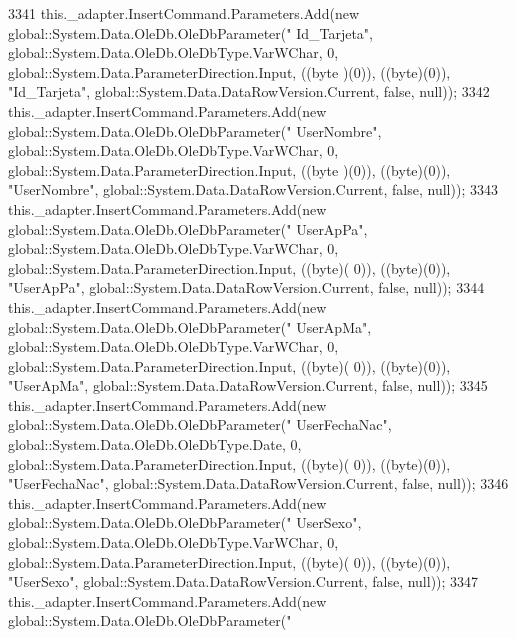 \begin{DoxyCode}
3341             this.\_adapter.InsertCommand.Parameters.Add(\textcolor{keyword}{new} global::System.Data.OleDb.OleDbParameter(\textcolor{stringliteral}{"
      Id\_Tarjeta"}, global::System.Data.OleDb.OleDbType.VarWChar, 0, global::System.Data.ParameterDirection.Input, ((byte
      )(0)), ((byte)(0)), \textcolor{stringliteral}{"Id\_Tarjeta"}, global::System.Data.DataRowVersion.Current, \textcolor{keyword}{false}, null));
3342             this.\_adapter.InsertCommand.Parameters.Add(\textcolor{keyword}{new} global::System.Data.OleDb.OleDbParameter(\textcolor{stringliteral}{"
      UserNombre"}, global::System.Data.OleDb.OleDbType.VarWChar, 0, global::System.Data.ParameterDirection.Input, ((byte
      )(0)), ((byte)(0)), \textcolor{stringliteral}{"UserNombre"}, global::System.Data.DataRowVersion.Current, \textcolor{keyword}{false}, null));
3343             this.\_adapter.InsertCommand.Parameters.Add(\textcolor{keyword}{new} global::System.Data.OleDb.OleDbParameter(\textcolor{stringliteral}{"
      UserApPa"}, global::System.Data.OleDb.OleDbType.VarWChar, 0, global::System.Data.ParameterDirection.Input, ((byte)(
      0)), ((byte)(0)), \textcolor{stringliteral}{"UserApPa"}, global::System.Data.DataRowVersion.Current, \textcolor{keyword}{false}, null));
3344             this.\_adapter.InsertCommand.Parameters.Add(\textcolor{keyword}{new} global::System.Data.OleDb.OleDbParameter(\textcolor{stringliteral}{"
      UserApMa"}, global::System.Data.OleDb.OleDbType.VarWChar, 0, global::System.Data.ParameterDirection.Input, ((byte)(
      0)), ((byte)(0)), \textcolor{stringliteral}{"UserApMa"}, global::System.Data.DataRowVersion.Current, \textcolor{keyword}{false}, null));
3345             this.\_adapter.InsertCommand.Parameters.Add(\textcolor{keyword}{new} global::System.Data.OleDb.OleDbParameter(\textcolor{stringliteral}{"
      UserFechaNac"}, global::System.Data.OleDb.OleDbType.Date, 0, global::System.Data.ParameterDirection.Input, ((byte)(
      0)), ((byte)(0)), \textcolor{stringliteral}{"UserFechaNac"}, global::System.Data.DataRowVersion.Current, \textcolor{keyword}{false}, null));
3346             this.\_adapter.InsertCommand.Parameters.Add(\textcolor{keyword}{new} global::System.Data.OleDb.OleDbParameter(\textcolor{stringliteral}{"
      UserSexo"}, global::System.Data.OleDb.OleDbType.VarWChar, 0, global::System.Data.ParameterDirection.Input, ((byte)(
      0)), ((byte)(0)), \textcolor{stringliteral}{"UserSexo"}, global::System.Data.DataRowVersion.Current, \textcolor{keyword}{false}, null));
3347             this.\_adapter.InsertCommand.Parameters.Add(\textcolor{keyword}{new} global::System.Data.OleDb.OleDbParameter(\textcolor{stringliteral}{"
}
\end{DoxyCode}
